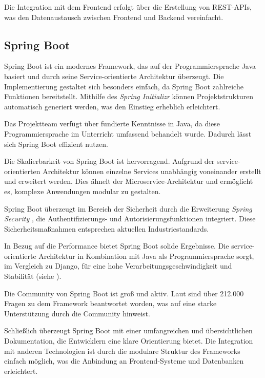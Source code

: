 Die Integration mit dem Frontend erfolgt über die Erstellung von REST-APIs, was den Datenaustausch zwischen Frontend und Backend vereinfacht.


\subsection{Spring Boot}
Spring Boot ist ein modernes Framework, das auf der Programmiersprache Java basiert und durch seine Service-orientierte Architektur überzeugt. \cite{website-springboot} Die Implementierung gestaltet sich besonders einfach, da Spring Boot zahlreiche Funktionen bereitstellt. Mithilfe des \textit{Spring Initializr} \cite{website-spring-initializr} können Projektstrukturen automatisch generiert werden, was den Einstieg erheblich erleichtert.

Das Projektteam verfügt über fundierte Kenntnisse in Java, da diese Programmiersprache im Unterricht umfassend behandelt wurde. Dadurch lässt sich Spring Boot effizient nutzen.

Die Skalierbarkeit von Spring Boot ist hervorragend. \cite{website-spring-scaling} Aufgrund der service-orientierten Architektur können einzelne Services unabhängig voneinander erstellt und erweitert werden. Dies ähnelt der Microservice-Architektur und ermöglicht es, komplexe Anwendungen modular zu gestalten.

Spring Boot überzeugt im Bereich der Sicherheit durch die Erweiterung \textit{Spring Security} \cite{website-spring_security}, die Authentifizierungs- und Autorisierungsfunktionen integriert. Diese Sicherheitsmaßnahmen entsprechen aktuellen Industriestandards. \cite{website-security-industry-standards}

In Bezug auf die Performance bietet Spring Boot solide Ergebnisse. Die service-orientierte Architektur in Kombination mit Java als Programmiersprache sorgt, im Vergleich zu Django, für eine hohe Verarbeitungsgeschwindigkeit und Stabilität (siehe \cite{website-performance-spring-boot-vs-django}).

Die Community von Spring Boot ist groß und aktiv. Laut \cite{website-stackoverflow-spring-boot} sind über 212.000 Fragen zu dem Framework beantwortet worden, was auf eine starke Unterstützung durch die Community hinweist.

Schließlich überzeugt Spring Boot mit einer umfangreichen und übersichtlichen Dokumentation, die Entwicklern eine klare Orientierung bietet. \cite{website-spring-docs} Die Integration mit anderen Technologien ist durch die modulare Struktur des Frameworks einfach möglich, was die Anbindung an Frontend-Systeme und Datenbanken erleichtert. 

\newpage



